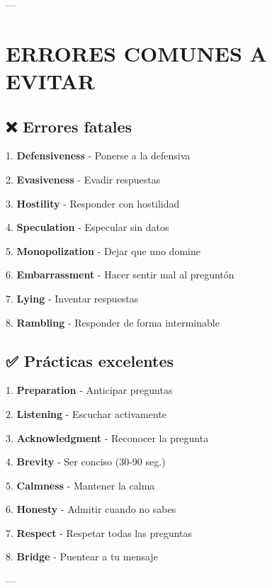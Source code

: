 \documentclass[a4paper,11pt]{article}
\begin{document}
---

\vspace{0.2cm}

\section{ERRORES COMUNES A EVITAR}

\vspace{0.2cm}

\subsection{❌ Errores fatales}

1. \textbf{Defensiveness} - Ponerse a la defensiva

2. \textbf{Evasiveness} - Evadir respuestas

3. \textbf{Hostility} - Responder con hostilidad

4. \textbf{Speculation} - Especular sin datos

5. \textbf{Monopolization} - Dejar que uno domine

6. \textbf{Embarrassment} - Hacer sentir mal al preguntón

7. \textbf{Lying} - Inventar respuestas

8. \textbf{Rambling} - Responder de forma interminable

\vspace{0.2cm}

\subsection{✅ Prácticas excelentes}

1. \textbf{Preparation} - Anticipar preguntas

2. \textbf{Listening} - Escuchar activamente

3. \textbf{Acknowledgment} - Reconocer la pregunta

4. \textbf{Brevity} - Ser conciso (30-90 seg.)

5. \textbf{Calmness} - Mantener la calma

6. \textbf{Honesty} - Admitir cuando no sabes

7. \textbf{Respect} - Respetar todas las preguntas

8. \textbf{Bridge} - Puentear a tu mensaje

\vspace{0.2cm}

---

\vspace{0.2cm}
\end{document}
